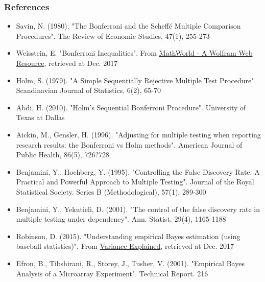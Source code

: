\documentclass{beamer}
\begin{document}
\frame
{
    \frametitle{\LARGE References}
    \scriptsize
    \begin{itemize}
    \item Savin, N. (1980). "The Bonferroni and the Scheff\'e Multiple Comparison Procedures". The Review of Economic Studies, 47(1), 255-273\\
\item Weisstein, E. "Bonferroni Inequalities". From \href{http://mathworld.wolfram.com/BonferroniInequalities.html}{MathWorld - A Wolfram Web Resource}, retrieved at Dec. 2017
\item Holm, S. (1979). "A Simple Sequentially Rejective Multiple Test Procedure". Scandinavian Journal of Statistics, 6(2), 65-70\\
\item Abdi, H. (2010). "Holm's Sequential Bonferroni Procedure". University of Texas at Dallas\\
\item Aickin, M., Gensler, H. (1996). "Adjusting for multiple testing when reporting research results: the Bonferroni vs Holm methods". American Journal of Public Health, 86(5), 726?728\\
\item Benjamini, Y., Hochberg, Y. (1995). "Controlling the False Discovery Rate: A Practical and Powerful Approach to Multiple Testing". Journal of the Royal Statistical Society. Series B (Methodological), 57(1), 289-300\\
\item Benjamini, Y., Yekutieli, D. (2001). "The control of the false discovery rate in multiple testing under dependency". Ann. Statist. 29(4), 1165-1188\\
\item Robinson, D. (2015). "Understanding empirical Bayes estimation (using baseball statistics)". From \href{http://varianceexplained.org/r/empirical\_bayes\_baseball/}{Variance Explained}, retrieved at Dec. 2017 \\
\item Efron, B., Tibshirani, R., Storey, J., Tusher, V. (2001). "Empirical Bayes Analysis of a Microarray Experiment". Technical Report. 216\\
    \end{itemize}
}
\end{document}
